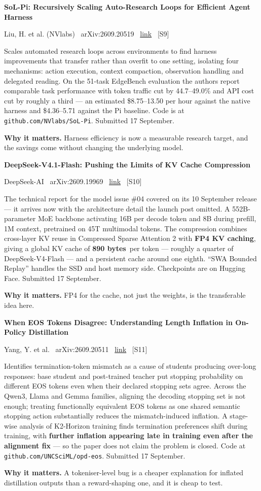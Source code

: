 \documentclass[11pt,a4paper]{article}
\newcommand{\entry}[4]{%
  \par\vspace{0.7em}%
  {\sffamily\bfseries\color{brandink}#1}\par
  {\footnotesize\color{brandgrey}#2 \textbullet\ \href{#3}{link} \textbullet\ \srcref{#4}}\par
  \vspace{0.15em}}
\newcommand{\why}[1]{\par{\small\textbf{Why it matters.} #1}\par}
\newcommand{\srcref}[1]{\textcolor{brandaccent}{[S#1]}}
\newcommand{\stat}[2]{{\sffamily\bfseries\color{brandink}#1}~{\footnotesize\color{brandgrey}#2}}
\begin{document}
\entry{SoL-Pi: Recursively Scaling Auto-Research Loops for Efficient Agent Harness}{Liu, H. et al. (NVlabs) \textbullet\ arXiv:2609.20519}{https://arxiv.org/abs/2609.20519}{9}
Scales automated research loops across environments to find harness improvements that
transfer rather than overfit to one setting, isolating four mechanisms: action
execution, context compaction, observation handling and delegated reading. On the
51-task EdgeBench evaluation the authors report comparable task performance with
token traffic cut by 44.7--49.0\% and API cost cut by roughly a third --- an estimated
\$8.75--13.50 per hour against the native harness and \$4.36--5.71 against the Pi
baseline. Code is at \texttt{github.com/NVlabs/SoL-Pi}. Submitted 17 September.
\why{Harness efficiency is now a measurable research target, and the savings come
without changing the underlying model.}

\entry{DeepSeek-V4.1-Flash: Pushing the Limits of KV Cache Compression}{DeepSeek-AI \textbullet\ arXiv:2609.19969}{https://arxiv.org/abs/2609.19969}{10}
The technical report for the model issue \#04 covered on its 10 September release ---
it arrives now with the architecture detail the launch post omitted. A 552B-parameter
MoE backbone activating 16B per decode token and 8B during prefill, 1M context,
pretrained on 45T multimodal tokens. The compression combines cross-layer KV reuse in
Compressed Sparse Attention 2 with \textbf{FP4 KV caching}, giving a global KV cache
of \stat{890 bytes}{per token} --- roughly a quarter of DeepSeek-V4-Flash --- and a
persistent cache around one eighth. ``SWA Bounded Replay'' handles the SSD and host
memory side. Checkpoints are on Hugging Face. Submitted 17 September.
\why{FP4 for the cache, not just the weights, is the transferable idea here.}

\entry{When EOS Tokens Disagree: Understanding Length Inflation in On-Policy Distillation}{Yang, Y. et al. \textbullet\ arXiv:2609.20511}{https://arxiv.org/abs/2609.20511}{11}
Identifies termination-token mismatch as a cause of students producing over-long
responses: base student and post-trained teacher put stopping probability on
different EOS tokens even when their declared stopping sets agree. Across the Qwen3,
Llama and Gemma families, aligning the decoding stopping set is not enough; treating
functionally equivalent EOS tokens as one shared semantic stopping action
substantially reduces the mismatch-induced inflation. A stage-wise analysis of
K2-Horizon training finds termination preferences shift during training, with
\textbf{further inflation appearing late in training even after the alignment fix} ---
so the paper does not claim the problem is closed. Code at
\texttt{github.com/UNCSciML/opd-eos}. Submitted 17 September.
\why{A tokeniser-level bug is a cheaper explanation for inflated distillation outputs
than a reward-shaping one, and it is cheap to test.}
\end{document}
